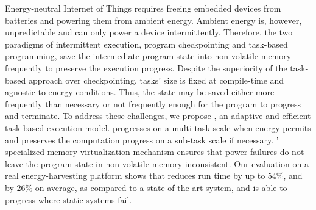 Energy-neutral Internet of Things requires freeing embedded devices from batteries and powering them from ambient energy.
Ambient energy is, however, unpredictable and can only power a device intermittently.
Therefore, the two paradigms of intermittent execution, program checkpointing and task-based programming, save the intermediate program state into non-volatile memory frequently to preserve the execution progress.
Despite the superiority of the task-based approach over checkpointing, tasks' size is fixed at compile-time and agnostic to energy conditions.
Thus, the state may be saved either more frequently than necessary or not frequently enough for the program to progress and terminate.
To address these challenges, we propose \sys, an adaptive and efficient task-based execution model.
\sys progresses on a multi-task scale when energy permits and preserves the computation progress on a sub-task scale if necessary.
\sys' specialized memory virtualization mechanism ensures that power failures do not leave the program state in non-volatile memory inconsistent.
Our evaluation on a real energy-harvesting platform shows that \sys reduces run time by up to 54\%, and by 26\% on average, as compared to a state-of-the-art system, and is able to progress where static systems fail.